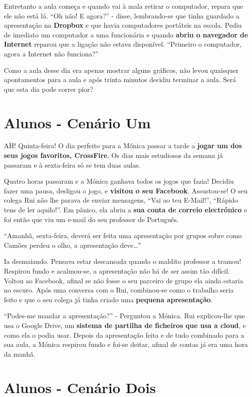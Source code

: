 Entretanto a aula começa e quando vai à mala retirar o computador, repara que ele não está lá. ``Oh não! E agora?'' - disse, lembrando-se que tinha guardado a apresentação na \textbf{Dropbox} e que havia computadores portáteis na escola. Pediu de imediato um computador a uma funcionária e quando \textbf{abriu o navegador de Internet} reparou que a ligação não estava disponível. ``Primeiro o computador, agora a Internet não funciona?''

Como a aula desse dia era apenas mostrar alguns gráficos, não levou quaisquer apontamentos para a aula e após trinta minutos decidiu terminar a aula. Será que esta dia pode correr pior?

\section{Alunos - Cenário Um}

AH! Quinta-feira! O dia perfeito para a Mónica passar a tarde a \textbf{jogar um dos seus jogos favoritos, CrossFire}. Os dias mais estudiosos da semana já passaram e à sexta-feira só se tem duas aulas.

Quatro horas passaram e a Mónica ganhava todos os jogos que fazia! Decidiu fazer uma pausa, desligou o jogo, e \textbf{visitou o seu Facebook}. Assustou-se! O seu colega Rui não lhe parava de enviar mensagens, “Vai ao teu E-Mail!”, “Rápido tens de ler aquilo!”. Em pânico, ela abriu a \textbf{sua conta de correio electrónico} e foi então que viu um e-mail do seu professor de Português.

“Amanhã, sexta-feira, deverá ser feita uma apresentação por grupos sobre como Camões perdeu o olho, a apresentação deve…”

Ia desmaiando. Pensava estar descansada quando o maldito professor a tramou! Respirou fundo e acalmou-se, a apresentação não há de ser assim tão difícil. Voltou ao Facebook, afinal se não fosse o seu parceiro de grupo ela ainda estaria no escuro. Após uma conversa com o Rui, combinou-se como o trabalho seria feito e que o seu colega já tinha criado uma \textbf{pequena apresentação}.

“Podes-me mandar a apresentação?” - Perguntou a Mónica.
Rui explicou-lhe que usa o Google Drive, um \textbf{sistema de partilha de ficheiros que usa a cloud}, e como ela o podia usar. Depois da apresentação feita e de tudo combinado para a sua aula, a Mónica respirou fundo e foi-se deitar, afinal de contas já era uma hora da manhã.

\section{Alunos - Cenário Dois}

